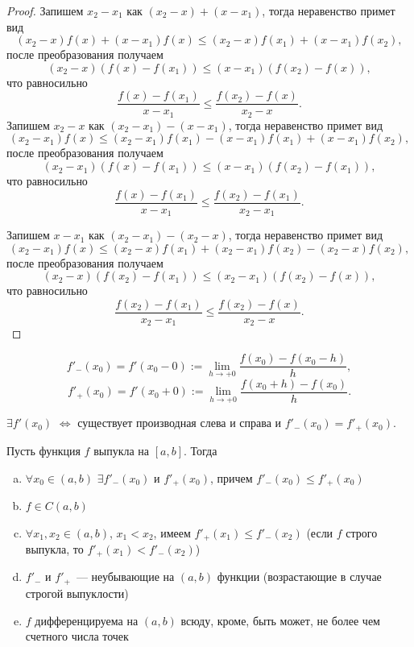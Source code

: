\documentclass[12pt]{article}
\begin{document}
	\begin{proof}
		Запишем $x_2 - x_1$ как $(x_2 - x) + (x - x_1)$, тогда неравенство примет вид
		\[
		(x_2 - x)f(x) + (x - x_1)f(x) \leqslant (x_2 - x)f(x_1) + (x - x_1)f(x_2),
		\]
		после преобразования получаем
		\[
		(x_2 - x)(f(x) - f(x_1)) \leqslant (x - x_1)(f(x_2) - f(x)),
		\]
		что равносильно
		$$
		\frac{f(x) - f(x_1)}{x - x_1} \leqslant \frac{f(x_2) - f(x)}{x_2 - x}.
		$$
		\noindent
		Запишем $x_2 - x$ как $(x_2 - x_1) - (x - x_1)$, тогда неравенство примет вид
		\[
		(x_2 - x_1)f(x) \leqslant (x_2 - x_1)f(x_1) - (x - x_1)f(x_1) + (x - x_1)f(x_2),
		\]
		после преобразования получаем
		\[
		(x_2 - x_1)(f(x) - f(x_1)) \leqslant (x - x_1)(f(x_2) - f(x_1)),
		\]
		что равносильно
		$$
		\frac{f(x) - f(x_1)}{x - x_1} \leqslant \frac{f(x_2) - f(x_1)}{x_2 - x_1}.
		$$
		
		\noindent
		Запишем $x - x_1$ как $(x_2 - x_1) - (x_2 - x)$, тогда неравенство примет вид
		\[
		(x_2 - x_1)f(x) \leqslant (x_2 - x)f(x_1) + (x_2 - x_1)f(x_2) - (x_2 - x)f(x_2),
		\]
		после преобразования получаем
		\[
		(x_2 - x)(f(x_2) - f(x_1)) \leqslant (x_2 - x_1)(f(x_2) - f(x)),
		\]
		что равносильно
		$$
		\frac{f(x_2) - f(x_1)}{x_2 - x_1} \leqslant \frac{f(x_2) - f(x)}{x_2 - x}.
		$$
	\end{proof}
	\begin{definition}
		$$
		f'_{-}(x_0) = f'(x_0 - 0) := \lim\limits_{h \to +0} \dfrac{f(x_0) - f(x_0 - h)}{h},
		$$
		$$
		f'_{+}(x_0) = f'(x_0 + 0) := \lim\limits_{h \to +0} \dfrac{f(x_0 + h) - f(x_0)}{h}.
		$$
	\end{definition}
	\begin{note}
		$\exists f'(x_0)$ $\Leftrightarrow$ существует производная слева и справа и $f'_{-}(x_0) = f'_{+}(x_0)$.
	\end{note}
	\begin{theorem}
		Пусть функция $f$ выпукла на $[a, b]$. Тогда
		\begin{enumerate}[a)]
			\item $\forall x_0 \in (a, b)$ $\exists f'_-(x_0)$ и $f'_+(x_0)$, причем $f'_-(x_0) \leqslant f'_+(x_0)$
			\item $f \in C(a, b)$
			\item $\forall x_1, x_2 \in (a, b)$, $x_1 < x_2$, имеем $f'_+(x_1) \leqslant f'_-(x_2)$ (если $f$ строго выпукла, то $f'_+(x_1) < f'_-(x_2)$)
			\item $f'_-$ и $f'_+$~--- неубывающие на $(a, b)$ функции (возрастающие в случае строгой выпуклости)
			\item $f$ дифференцируема на $(a, b)$ всюду, кроме, быть может, не более чем счетного числа точек
		\end{enumerate}
	\end{theorem}
\end{document}

